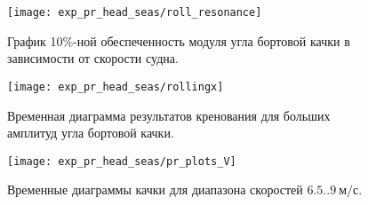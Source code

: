 \begin{sidewaysfigure}
	\begin{center}
	\texttt{[image: exp\_pr\_head\_seas/roll\_resonance]}
	\end{center}
	\caption{График 10\%-ной обеспеченность модуля угла бортовой качки в зависимости от скорости судна.}
	\label{pr2_res}
\end{sidewaysfigure}



\begin{figure}[h!]
	\begin{center}
	\texttt{[image: exp\_pr\_head\_seas/rollingx]}
	\end{center}
	\caption{Временная диаграмма результатов кренования для больших амплитуд угла бортовой качки.}
	\label{rollingx}
\end{figure}


\begin{sidewaysfigure}
	\begin{center}
	\texttt{[image: exp\_pr\_head\_seas/pr\_plots\_V]}
	\end{center}
	\caption{Временные диаграммы качки для диапазона скоростей $6.5..9\ \text{м/с}$.}
	\label{exp_pr_rolling_resonance_lag}
\end{sidewaysfigure}

